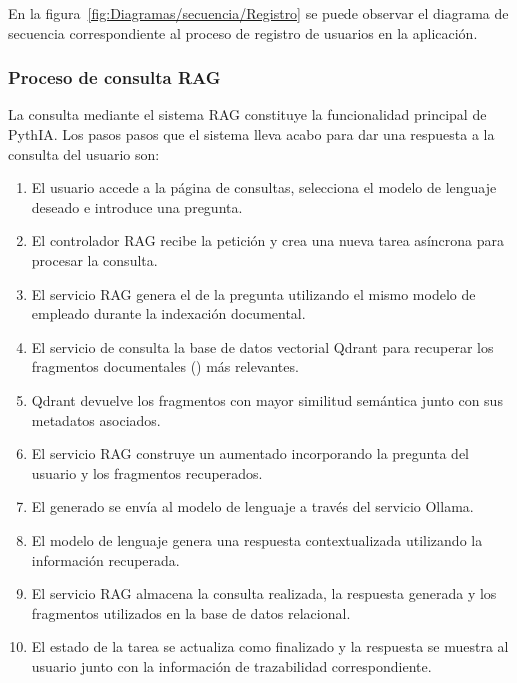 En la figura~\ref{fig:Diagramas/secuencia/Registro} se puede observar el diagrama de secuencia correspondiente al proceso de registro de usuarios en la aplicación.


\subsubsection{Proceso de consulta RAG}

La consulta mediante el sistema RAG constituye la funcionalidad principal de PythIA. Los pasos pasos que el sistema lleva acabo para dar una respuesta a la consulta del usuario son:
\begin{enumerate}
	\item El usuario accede a la página de consultas, selecciona el modelo de lenguaje deseado e introduce una pregunta.
	\item El controlador RAG recibe la petición y crea una nueva tarea asíncrona para procesar la consulta.
	\item El servicio RAG genera el  de la pregunta utilizando el mismo modelo de  empleado durante la indexación documental.
	\item El servicio de  consulta la base de datos vectorial Qdrant para recuperar los fragmentos documentales () más relevantes.
	\item Qdrant devuelve los fragmentos con mayor similitud semántica junto con sus metadatos asociados.
	\item El servicio RAG construye un  aumentado incorporando la pregunta del usuario y los fragmentos recuperados.
	\item El  generado se envía al modelo de lenguaje a través del servicio Ollama.
	\item El modelo de lenguaje genera una respuesta contextualizada utilizando la información recuperada.
	\item El servicio RAG almacena la consulta realizada, la respuesta generada y los fragmentos utilizados en la base de datos relacional.
	\item El estado de la tarea se actualiza como finalizado y la respuesta se muestra al usuario junto con la información de trazabilidad correspondiente.
\end{enumerate}

